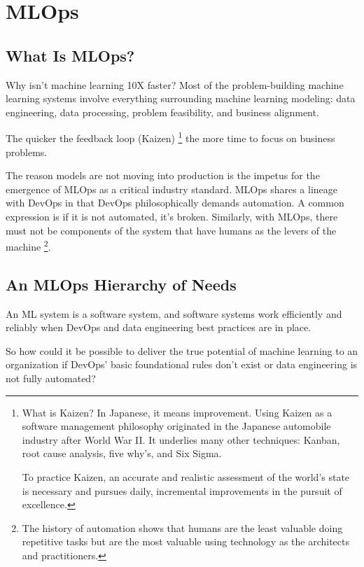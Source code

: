 \section{MLOps}



\subsection{What Is MLOps?}
Why isn't machine learning 10X faster?
Most of the problem-building machine learning systems involve
everything surrounding machine learning modeling: data engineering,
data processing, problem feasibility, and business alignment.

The quicker the feedback loop (Kaizen)
\footnote{
    What is Kaizen? In Japanese, it means improvement.
    Using Kaizen as a software management philosophy originated in
    the Japanese automobile industry after World War II. It
    underlies many other techniques: Kanban, root cause analysis,
    five why's, and Six Sigma.
    
    To practice Kaizen, an accurate and realistic assessment of
    the world's state is necessary and pursues daily, incremental
    improvements in the pursuit of excellence.
}
the more time to focus on business problems.

The reason models are not moving into production is the impetus
for the emergence of MLOps as a critical industry standard.
MLOps shares a lineage with DevOps in that DevOps philosophically
demands automation. A common expression is if it is not automated,
it's broken. Similarly, with MLOps, there must not be components of
the system that have humans as the levers of the machine
\footnote{
    The history of automation shows that humans are the least
    valuable doing repetitive tasks but are the most valuable
    using technology as the architects and practitioners.
}.



\subsection{An MLOps Hierarchy of Needs}
An ML system is a software system, and software systems work
efficiently and reliably when DevOps and data engineering best
practices are in place.

So how could it be possible to deliver the true potential of
machine learning to an organization if DevOps' basic foundational
rules don't exist or data engineering is not fully automated?


